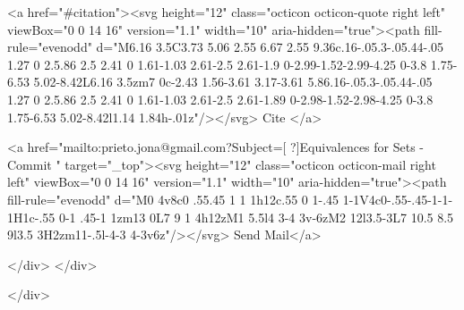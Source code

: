       <a  href="#citation"><svg height="12" class="octicon octicon-quote right left" viewBox="0 0 14 16" version="1.1" width="10" aria-hidden="true"><path fill-rule="evenodd" d="M6.16 3.5C3.73 5.06 2.55 6.67 2.55 9.36c.16-.05.3-.05.44-.05 1.27 0 2.5.86 2.5 2.41 0 1.61-1.03 2.61-2.5 2.61-1.9 0-2.99-1.52-2.99-4.25 0-3.8 1.75-6.53 5.02-8.42L6.16 3.5zm7 0c-2.43 1.56-3.61 3.17-3.61 5.86.16-.05.3-.05.44-.05 1.27 0 2.5.86 2.5 2.41 0 1.61-1.03 2.61-2.5 2.61-1.89 0-2.98-1.52-2.98-4.25 0-3.8 1.75-6.53 5.02-8.42l1.14 1.84h-.01z"/></svg> Cite
      </a>

      <a href="mailto:prieto.jona@gmail.com?Subject=[ ?]Equivalences for Sets - Commit " target="_top"><svg height="12" class="octicon octicon-mail right left" viewBox="0 0 14 16" version="1.1" width="10" aria-hidden="true"><path fill-rule="evenodd" d="M0 4v8c0 .55.45 1 1 1h12c.55 0 1-.45 1-1V4c0-.55-.45-1-1-1H1c-.55 0-1 .45-1 1zm13 0L7 9 1 4h12zM1 5.5l4 3-4 3v-6zM2 12l3.5-3L7 10.5 8.5 9l3.5 3H2zm11-.5l-4-3 4-3v6z"/></svg> Send Mail</a>

    </div>
  </div>

</div>




